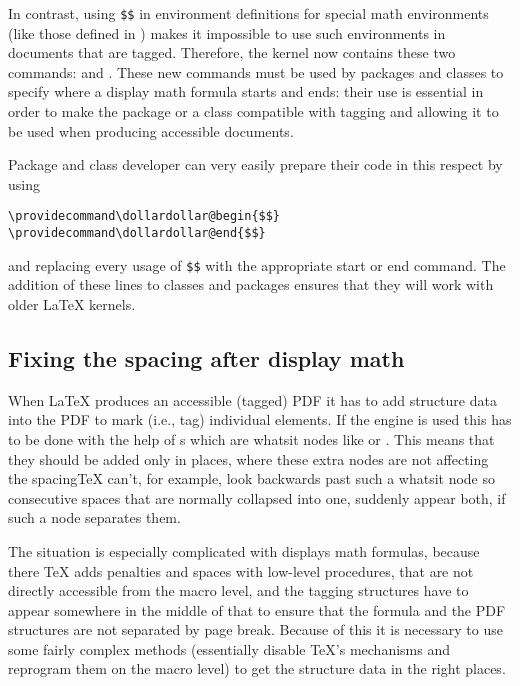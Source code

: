 \documentclass{ltnews}
\providecommand\Dash {\unskip \textemdash}
\providecommand\pdfTeX{\hologo{pdfTeX}}
\begin{document}
In contrast, using \verb=$$= in environment definitions for special
math environments (like those defined in ) makes it
impossible to use such environments in documents that are tagged.
Therefore, the kernel now contains these two commands:
 and .  These new commands
must be used by packages and classes to specify where a display math
formula starts and ends: their use is essential in order to make the
package or a class compatible with tagging and allowing it to be used
when producing accessible documents.

Package and class developer can very easily prepare their code in this
respect by using
\begin{verbatim}
\providecommand\dollardollar@begin{$$}
\providecommand\dollardollar@end{$$}
\end{verbatim}
and replacing every usage of \verb=$$= with the appropriate start or
end command.  The addition of these  lines to
classes and packages ensures that they will work with older \LaTeX{}
kernels.



\subsection{Fixing the spacing after display math}

When \LaTeX{} produces an accessible (tagged) PDF it has to add
structure data into the PDF to mark (i.e., tag) individual
elements. If the \pdfTeX{} engine is used this has to be done with the
help of s which are whatsit nodes like  or
. This means that they should be added only in places, where
these extra nodes are not affecting the spacing\Dash \TeX{} can't, for
example, look backwards past such a whatsit node so consecutive spaces
that are normally collapsed into one, suddenly appear both, if such a
node separates them.

The situation is especially complicated with displays math formulas,
because there \TeX{} adds penalties and spaces with low-level
procedures, that are not directly accessible from the macro level, and
the tagging structures have to appear somewhere in the middle of that
to ensure that the formula and the PDF structures are not separated by
page break. Because of this it is necessary to use some fairly complex
methods (essentially disable \TeX's mechanisms and reprogram them on
the macro level) to get the structure data in the right places.
\end{document}

